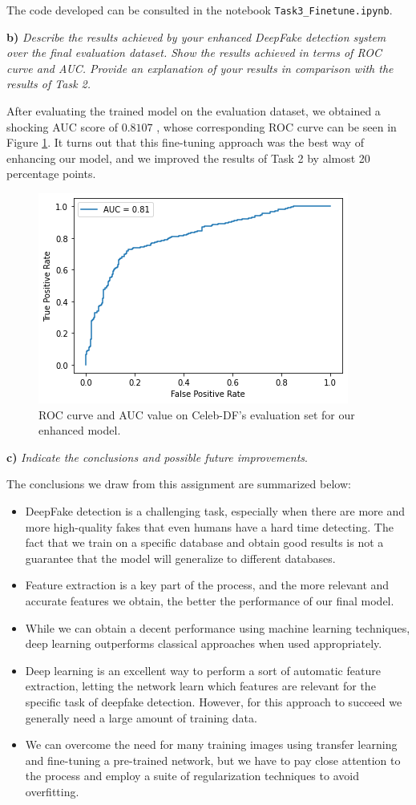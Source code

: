 \documentclass[11pt]{article}
\begin{document}
The code developed can be consulted in the notebook \texttt{Task3\_Finetune.ipynb}.

\textbf{b)} \textit{Describe the results achieved by your enhanced DeepFake detection system over the final evaluation dataset. Show the results achieved in terms of ROC curve and AUC. Provide an explanation of your results in comparison with the results of Task 2.}

After evaluating the trained model on the evaluation dataset, we obtained a shocking AUC score of $0.8107$ , whose corresponding ROC curve can be seen in Figure \ref{fig:t3}. It turns out that this fine-tuning approach was the best way of enhancing our model, and we improved the results of Task 2 by almost 20 percentage points.

\begin{figure}[h!]
  \centering
  \includegraphics[width=.6\textwidth]{img/3-finetune-roc-celeb}
  \caption{ROC curve and AUC value on Celeb-DF's evaluation set for our enhanced model.}
  \label{fig:t3}
\end{figure}

\textbf{c)} \textit{Indicate the conclusions and possible future improvements}.

The conclusions we draw from this assignment are summarized below:

\begin{itemize}
  \item DeepFake detection is a challenging task, especially when there are more and more high-quality fakes that even humans have a hard time detecting. The fact that we train on a specific database and obtain good results is not a guarantee that the model will generalize to different databases.
  \item Feature extraction is a key part of the process, and the more relevant and accurate features we obtain, the better the performance of our final model.
  \item While we can obtain a decent performance using machine learning techniques, deep learning outperforms classical approaches when used appropriately.
  \item Deep learning is an excellent way to perform a sort of automatic feature extraction, letting the network learn which features are relevant for the specific task of deepfake detection. However, for this approach to succeed we generally need a large amount of training data.
  \item We can overcome the need for many training images using transfer learning and fine-tuning a pre-trained network, but we have to pay close attention to the process and employ a suite of regularization techniques to avoid overfitting.
\end{itemize}
\end{document}
